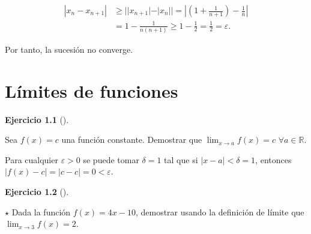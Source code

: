 \documentclass[
  spanish,
  a4paper,
]{scrreport}
\theoremstyle{definition}
\newtheorem{exercise}{Ejercicio}[chapter]
\theoremstyle{remark}
\begin{document}
\begin{tcolorbox}
\begin{align*}
|x_n-x_{n+1}| &\geq ||x_{n+1}|-|x_n|| =\left|\left(1+\frac{1}{n+1}\right)-\frac{1}{n}\right|\\ 
&=1-\frac{1}{n(n+1)}\geq 1 -\frac{1}{2} = \frac{1}{2}=\varepsilon.
\end{align*}

Por tanto, la sucesión no converge.

\end{tcolorbox}


\chapter{Límites de funciones}\label{luxedmites-de-funciones}

\begin{exercise}[]\protect\hypertarget{exr-funcion-constante}{}\label{exr-funcion-constante}

Sea \(f(x)=c\) una función constante. Demostrar que
\(\lim_{x\to a}f(x)=c\) \(\forall a\in\mathbb{R}\).

\end{exercise}

\begin{tcolorbox}[enhanced jigsaw, arc=.35mm, bottomrule=.15mm, bottomtitle=1mm, breakable, colback=white, colbacktitle=quarto-callout-tip-color!10!white, colframe=quarto-callout-tip-color-frame, coltitle=black, left=2mm, leftrule=.75mm, opacityback=0, opacitybacktitle=0.6, rightrule=.15mm, title=\textcolor{quarto-callout-tip-color}{\faLightbulb}\hspace{0.5em}{Solución}, titlerule=0mm, toprule=.15mm, toptitle=1mm]

Para cualquier \(\varepsilon>0\) se puede tomar \(\delta = 1\) tal que
si \(|x-a|<\delta=1\), entonces \(|f(x)-c| = |c-c|=0<\varepsilon\).

\end{tcolorbox}

\begin{exercise}[]\protect\hypertarget{exr-definicion-limite}{}\label{exr-definicion-limite}

\(\star\) Dada la función \(f(x)=4x-10\), demostrar usando la definición
de límite que \(\lim_{x\to 3}f(x)=2\).

\end{exercise}
\end{document}
